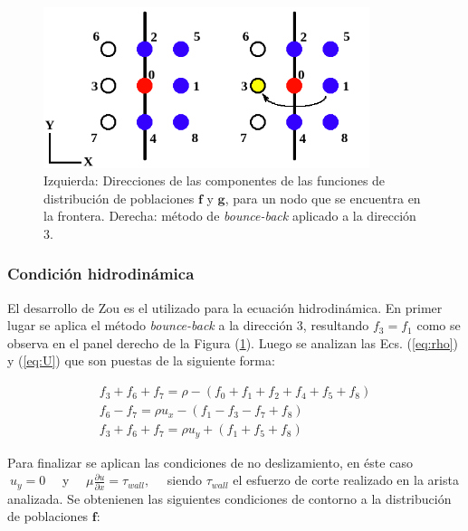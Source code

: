 \begin{figure}[h!]
	\centering
	\includegraphics[width=0.85\textwidth]{figs/cap2/CC_hidrodinamica.png}
	\caption{Izquierda: Direcciones de las componentes de las funciones de distribución de poblaciones $\mathbf{f}$ y $\mathbf{g}$, para un nodo que se encuentra en la frontera. Derecha: método de \textit{bounce-back} aplicado a la dirección 3.}
	\label{fig:CC_hidro}
\end{figure}




\subsubsection{Condición hidrodinámica}

El desarrollo de Zou \cite{zou1997pressure} es el utilizado para la ecuación hidrodinámica. En primer lugar se aplica el método \textit{bounce-back} a la dirección 3, resultando $f_{3} = f_{1}$ como se observa en el panel derecho de la Figura (\ref{fig:CC_hidro}). Luego se analizan las Ecs. (\ref{eq:rho}) y (\ref{eq:U}) que son puestas de la siguiente forma:

\begin{equation}
	\begin{array}{c}
	f_{3} + f_{6} + f_{7} = \rho - \left( f_{0} + f_{1} + f_{2} + f_{4} + f_{5} + f_{8}	 \right)\\
	f_{6} - f_{7} = \rho u_{x} - \left( f_{1} - f_{3} - f_{7} + f_{8} 	 \right)\\
	f_{3} + f_{6} + f_{7} = \rho u_{y} + \left( f_{1} + f_{5} + f_{8} \right)
	\end{array}
\end{equation}

Para finalizar se aplican las condiciones de no deslizamiento, en éste caso $\> u_{y} = 0\quad$ y $\quad\mu \frac{\partial u}{\partial x} = \tau_{wall},\quad$ siendo $\tau_{wall}$ el esfuerzo de corte realizado en la arista analizada. Se obtenienen las siguientes condiciones de contorno a la distribución de poblaciones $\mathbf{f}$:

